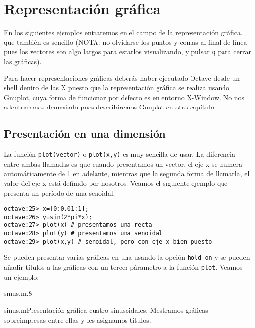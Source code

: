 \section{Representación gráfica}
En los siguientes ejemplos entraremos en el campo de la representación
gráfica,  que también  es sencillo  (NOTA: no  olvidarse los  puntos y
comas  al final  de  línea  pues los  vectores  son  algo largos  para
estarlos visualizando, y pulsar {\tt q} para cerrar las gráficas).

Para hacer  representaciones gráficas  deberás haber  ejecutado Octave
desde un shell dentro de las X puesto que la representación gráfica se
realiza  usando Gnuplot,  cuya forma  de funcionar  por defecto  es en
entorno  X-Window. No  nos adentraremos  demasiado pues  describiremos
Gnuplot en otro capítulo.

\subsection*{Presentación en  una dimensión}

La función  {\tt plot(vector)}  o {\tt plot(x,y)}  es muy  sencilla de
usar. La diferencia entre ambas  llamadas es que cuando presentamos un
vector, el eje x se numera  automáticamente de 1 en adelante, mientras
que la segunda forma de llamarla, el valor del eje x está definido por
nosotros. Veamos el  siguiente ejemplo que presenta un  período de una
senoidal.

\begin{verbatim}
octave:25> x=[0:0.01:1];
octave:26> y=sin(2*pi*x);
octave:27> plot(x) # presentamos una recta
octave:28> plot(y) # presentamos una senoidal
octave:29> plot(x,y) # senoidal, pero con eje x bien puesto
\end{verbatim}

Se pueden presentar varias gráficas en  una usando la opción {\tt hold
on} y se pueden añadir títulos  a las gráficas con un tercer párametro
a la función {\tt plot}. Veamos un ejemplo:

\begin{figura}{sinus.m}{.8}
\caption{Múltiples líneas por gráfica.}
\end{figura}

\begin{ejemplo}{sinus.m}{Presentación  gráfica  cuatro  sinusoidales.}
Mostramos gráficas sobreimpresas entre  ellas y les asignamos títulos.
\end{ejemplo}

